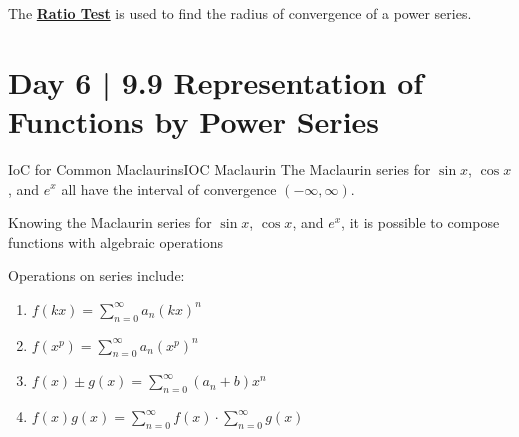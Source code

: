 \documentclass[10pt]{article}
\theoremstyle{definition}
\begin{document}
\vspace{0.3cm}

    The \hyperlink{Ratio Test}{\textbf{Ratio Test}} is used to find the radius of convergence of a power series.

\section{Day 6 | 9.9 Representation of Functions by Power Series}

\begin{theorem}{IoC for Common Maclaurins}{IOC Maclaurin}
    The Maclaurin series for $\sin x$, $\cos x$, and $e^x$ all have the interval of convergence $(-\infty, \infty)$.
\end{theorem}

    Knowing the Maclaurin series for $\sin x$, $\cos x$, and $e^x$, it is possible to compose functions with algebraic operations

\vspace{0.3cm}
Operations on series include:

\begin{enumerate}
    \item $\displaystyle f(kx)=\sum_{n=0}^{\infty} a_n(kx)^n$
    \item $\displaystyle f(x^p)=\sum_{n=0}^{\infty} a_n(x^p)^n$
    \item $\displaystyle f(x) \pm g(x)=\sum_{n=0}^{\infty} (a_n+b)x^n$
    \item $\displaystyle f(x)g(x)=\sum_{n=0}^{\infty} f(x) \cdot \sum_{n=0}^{\infty} g(x)$
\end{enumerate}
\end{document}
